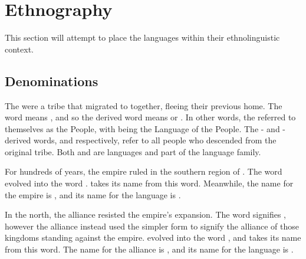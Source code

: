 \section{Ethnography}
\label{sec:tvk-ethnography}

This section will attempt to place the \langtvk{} languages within their ethnolinguistic context.

\subsection{Denominations}
\label{subsec:tvk-denominations}

The \peoptvk{} were a tribe that migrated to \landn{} together, fleeing their previous home. The \langtvk{} word   means , and so the derived word \fw{\npeoptvk}  means  or . In other words, the \peoptvk{} referred to themselves as the People, with \fw{\nlangtvk} being the Language of the People. The \langank- and \langrdk-derived words,   and   respectively, refer to all people who descended from the original \peoptvk{} tribe. Both \langank{} and \langrdk{} are \peoptvk{} languages and part of the \langtvk{} language family.

For hundreds of years, the empire ruled in the southern region of \landn. The \langtvk{} word    evolved into the \langank{} word  . \fw{\nlangank}   takes its name from this word. Meanwhile, the \langrdk{} name for the empire is  , and its name for the \langank{} language is  .

In the north, the alliance resisted the empire's expansion. The \langtvk{} word   signifies , however the alliance instead used the simpler form    to signify the alliance of those kingdoms standing against the empire.  evolved into the \langrdk{} word  , and \fw{\nlangrdk}   takes its name from this word. The \langank{} name for the alliance is  , and its name for the \langrdk{} language is  .